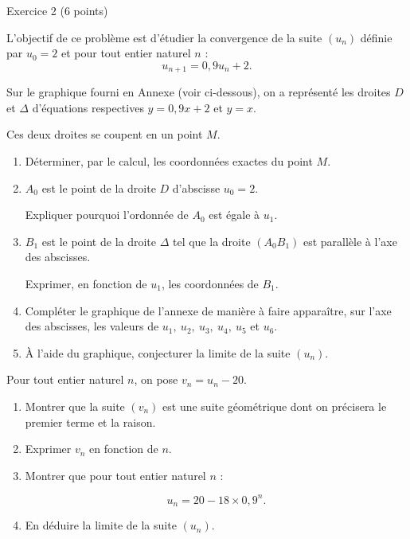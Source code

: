
%
\begin{h2}Exercice 2 (6 points)\end{h2}
\par
L'objectif de ce problème est d'étudier la convergence de la suite $(u_n)$ définie par $u_0=2$ et pour tout entier naturel $n$ :
\[ u_{n+1} = 0,9u_n+2.\]
\par
%
\par
{}
\par
Sur le graphique fourni en Annexe (voir ci-dessous), on a représenté les droites $D$ et $\Delta$ d'équations respectives $y=0,9x+2$ et $y=x$.
\par
Ces deux droites se coupent en un point $M$.
\par
\begin{enumerate}
     \item
     Déterminer, par le calcul, les coordonnées exactes du point $M$.
     \item
     $A_0$ est le point de la droite $D$ d'abscisse $u_0=2$.
     \par
     Expliquer pourquoi l'ordonnée de $A_0$ est égale à $u_1$.
     \item
     $B_1$ est le point de la droite $\Delta$ tel que la droite $(A_0B_1)$ est parallèle à l'axe des abscisses.
     \par
     Exprimer, en fonction de $u_1$, les coordonnées de $B_1$.
     \item
     Compléter le graphique de l'annexe de manière à faire apparaître, sur l'axe des abscisses, les valeurs de $u_1,\ u_2,\ u_3,\ u_4,\ u_5$ et $u_6$.
     \item
     \`A l'aide du graphique, conjecturer la limite de la suite $(u_n)$.
     \par
\end{enumerate}
\par
%
\par
{}
\par
Pour tout entier naturel $n$, on pose $v_n=u_n-20$.
\par
\begin{enumerate}
     \item
     Montrer que la suite $(v_n)$ est une suite géométrique dont on précisera le premier terme et la raison.
     \item
     Exprimer $v_n$ en fonction de $n$.
     \item
     Montrer que pour tout entier naturel $n$ :
     \par
     \[ u_n=20-18 \times 0,9^n. \]
     \item
     En déduire la limite de la suite $(u_n)$.
     \par
\end{enumerate}
